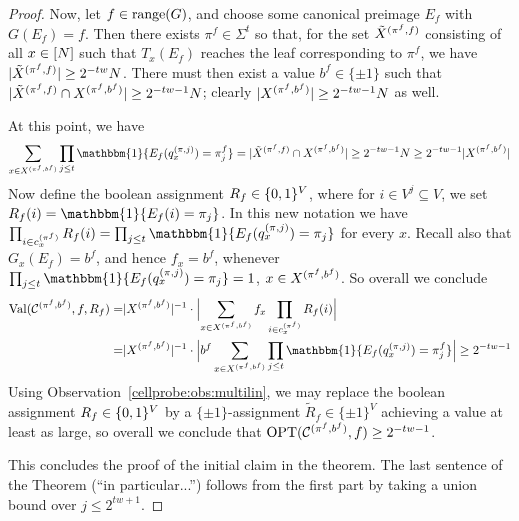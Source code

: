 \begin{proof}
Now, let $f \in \mathrm{range}(G)$, and choose some canonical preimage $E_f$ with $G(E_f)=f$. Then there exists $\pi^f \in \Sigma^t$ so that, for the set $\tilde{X}^{(\pi^f,f)}$ consisting of all $x \in [N]$ such that $T_x(E_f)$ reaches the leaf corresponding to $\pi^f$, we have $|\tilde{X}^{(\pi^f,f)}| \geq 2^{-tw}N$. There must then exist a value $b^f\in \{\pm 1\}$ such that $|\tilde{X}^{(\pi^f,f)} \cap X^{(\pi^f,b^f)}| \geq 2^{-tw-1}N$; clearly $|X^{(\pi^f,b^f)}| \geq 2^{-tw-1}N$ as well. 

At this point, we have
\[
 \sum_{x\in X^\p{\pi^f,b^f}} \prod_{j \leq t} \mathbbm{1}\{E_f(q^\p{\pi,j}_x)= \pi^f_j\} = |\tilde{X}^\p{\pi^f,f} \cap X^\p{\pi^f,b^f}| \geq 2^{-tw-1}N \geq 2^{-tw-1}|X^\p{\pi^f,b^f}|
\]
Now define the boolean assignment $R_f \in \{0,1\}^{V}$, where for $i \in V^j \subseteq V$, we set $R_f(i) = \mathbbm{1}\{E_f(i)=\pi_j\}$. In this new notation we have $\prod_{i \in c^\p{\pi^f}_x} R_f(i) = \prod_{j \leq t}\mathbbm{1}\{E_f(q^\p{\pi,j}_x) = \pi_j\}$ for every $x$. Recall also that $G_x(E_f) = b^f$, and hence $f_x = b^f$, whenever $\prod_{j \leq t}\mathbbm{1}\{E_f(q^\p{\pi,j}_x) = \pi_j\}=1$, $x\in X^{(\pi^f,b^f)}$. So overall we conclude
\begin{align*}
\Val(\mathcal{C}^\p{\pi^f,b^f},f,R_f) =&|X^\p{\pi^f,b^f}|^{-1} \cdot \Bigl|\sum_{x\in X^\p{\pi^f,b^f}} f_x\prod_{i \in c^\p{\pi^f}_x} R_f(i) \Bigr|\\ =&  |X^\p{\pi^f,b^f}|^{-1} \cdot \Bigl| b^f \sum_{x\in X^\p{\pi^f,b^f}} \prod_{j \leq t} \mathbbm{1}\{E_f(q^\p{\pi,j}_x)= \pi^f_j\}\Bigr| \geq 2^{-tw-1}
\end{align*}
Using Observation~\ref{cellprobe:obs:multilin}, we may replace the boolean assignment $R_f\in \{0,1\}^V$ by a $\{\pm 1\}$-assignment $\tilde{R}_f \in \{\pm 1\}^V$ achieving a value at least as large, so overall we conclude that $\mathrm{OPT}(\mathcal{C}^{(\pi^f,b^f)},f) \geq 2^{-tw-1}$.

This concludes the proof of the initial claim in the theorem. The last sentence of the Theorem (``in particular...'') follows from the first part by taking a union bound over $j \leq 2^{tw+1}$.
\end{proof}

